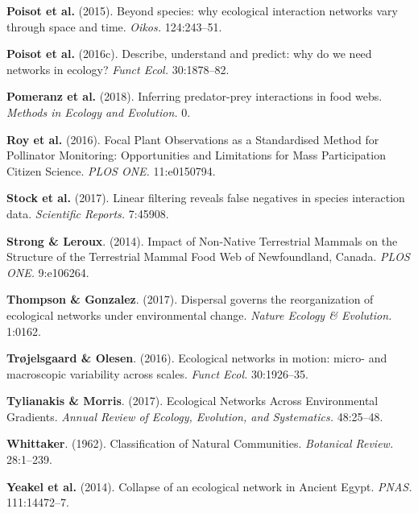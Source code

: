 \leavevmode\hypertarget{ref-PoisStou15}{}%
\textbf{Poisot et al.} (2015). Beyond species: why ecological
interaction networks vary through space and time. \emph{Oikos.}
124:243--51.

\leavevmode\hypertarget{ref-PoisStou16}{}%
\textbf{Poisot et al.} (2016c). Describe, understand and predict: why do
we need networks in ecology? \emph{Funct Ecol.} 30:1878--82.

\leavevmode\hypertarget{ref-PomeThom18}{}%
\textbf{Pomeranz et al.} (2018). Inferring predator-prey interactions in
food webs. \emph{Methods in Ecology and Evolution.} 0.

\leavevmode\hypertarget{ref-RoyBaxt16}{}%
\textbf{Roy et al.} (2016). Focal Plant Observations as a Standardised
Method for Pollinator Monitoring: Opportunities and Limitations for Mass
Participation Citizen Science. \emph{PLOS ONE.} 11:e0150794.

\leavevmode\hypertarget{ref-StocPois17}{}%
\textbf{Stock et al.} (2017). Linear filtering reveals false negatives
in species interaction data. \emph{Scientific Reports.} 7:45908.

\leavevmode\hypertarget{ref-StroLero14}{}%
\textbf{Strong \& Leroux}. (2014). Impact of Non-Native Terrestrial
Mammals on the Structure of the Terrestrial Mammal Food Web of
Newfoundland, Canada. \emph{PLOS ONE.} 9:e106264.

\leavevmode\hypertarget{ref-ThomGonz17}{}%
\textbf{Thompson \& Gonzalez}. (2017). Dispersal governs the
reorganization of ecological networks under environmental change.
\emph{Nature Ecology \& Evolution.} 1:0162.

\leavevmode\hypertarget{ref-TrojOles16}{}%
\textbf{Trøjelsgaard \& Olesen}. (2016). Ecological networks in motion:
micro- and macroscopic variability across scales. \emph{Funct Ecol.}
30:1926--35.

\leavevmode\hypertarget{ref-TyliMorr17}{}%
\textbf{Tylianakis \& Morris}. (2017). Ecological Networks Across
Environmental Gradients. \emph{Annual Review of Ecology, Evolution, and
Systematics.} 48:25--48.

\leavevmode\hypertarget{ref-Whit62}{}%
\textbf{Whittaker}. (1962). Classification of Natural Communities.
\emph{Botanical Review.} 28:1--239.

\leavevmode\hypertarget{ref-YeakPire14}{}%
\textbf{Yeakel et al.} (2014). Collapse of an ecological network in
Ancient Egypt. \emph{PNAS.} 111:14472--7. 
